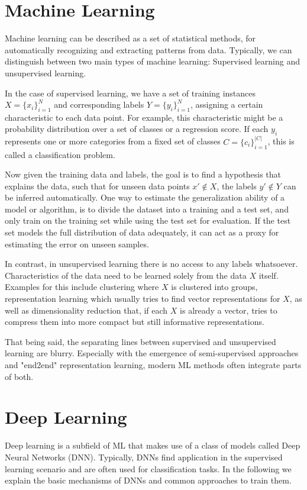 \section{Machine Learning}
Machine learning can be described as a set of statistical methods, for automatically recognizing and extracting patterns from data. Typically, we can distinguish between two main types of machine learning: Supervised learning and unsupervised learning.

In the case of supervised learning, we have a set of training instances $X = \{x_i\}_{i=1}^N$ and corresponding labels $Y = \{y_i\}_{i=1}^N$, assigning a certain characteristic to each data point. For example, this characteristic might be a probability distribution over a set of classes or a regression score. If each $y_i$ represents one or more categories from a fixed set of classes $C = \{c_i\}_{i=1}^{|C|}$, this is called a classification problem.

Now given the training data and labels, the goal is to find a hypothesis that explains the data, such that for unseen data points $x' \notin X$, the labels $y' \notin Y$ can be inferred automatically. One way to estimate the generalization ability of a model or algorithm, is to divide the dataset into a training and a test set, and only train on the training set while using the test set for evaluation. If the test set models the full distribution of data adequately, it can act as a proxy for estimating the error on unseen samples.

In contrast, in unsupervised learning there is no access to any labels whatsoever. Characteristics of the data need to be learned solely from the data $X$ itself. Examples for this include clustering where $X$ is clustered into groups, representation learning which usually tries to find vector representations for $X$, as well as dimensionality reduction that, if each $X$ is already a vector, tries to compress them into more compact but still informative representations.

That being said, the separating lines between supervised and unsupervised learning are blurry. Especially with the emergence of semi-supervised approaches and "end2end" representation learning, modern ML methods often integrate parts of both.

\section{Deep Learning}
Deep learning is a subfield of ML that makes use of a class of models called Deep Neural Networks (DNN). Typically, DNNs find application in the supervised learning scenario and are often used for classification tasks. In the following we explain the basic mechanisms of DNNs and common approaches to train them.

